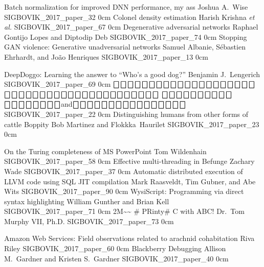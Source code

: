 \addpaper
	{Batch normalization for improved DNN performance, my ass}
	{Joshua A.\ Wise}
	{}
	{SIGBOVIK_2017_paper_32}
	{0cm}
	{}
\addpaper
	{Colonel density estimation}
	{Harish Krishna \textit{et al.}}
	{}
	{SIGBOVIK_2017_paper_67}
	{0cm}
	{}
\addpaper
	{Degenerative adversarial networks}
	{Raphael Gontijo Lopes and Diptodip Deb}
	{}
	{SIGBOVIK_2017_paper_74}
	{0cm}
	{}
\addpaper
	{Stopping GAN violence: Generative unadversarial networks}
	{Samuel Albanie, S\'ebastien Ehrhardt, and Jo\~ao Henriques}
	{}
	{SIGBOVIK_2017_paper_13}
	{0cm}
	{}


\addpaper
	{DeepDoggo: Learning the answer to ``Who's a good dog?''}
	{Benjamin J.\ Lengerich}
	{}
	{SIGBOVIK_2017_paper_69}
	{0cm}
	{}
\addpaper
	{$\bigbox\bigbox\bigbox\bigbox\bigbox\bigbox\bigbox\bigbox\bigbox\bigbox\bigbox\bigbox\bigbox\bigbox$\quad $\bigbox\bigbox\bigbox\bigbox\bigbox\bigbox$\quad $\bigbox\bigbox\bigbox\bigbox$\quad $\bigbox\bigbox\bigbox\bigbox\bigbox$\quad $\bigbox\bigbox\bigbox\bigbox\bigbox$\quad $\bigbox\bigbox$\quad $\bigbox\bigbox\bigbox\bigbox\bigbox\bigbox$}
	{$\bigbox\bigbox\bigbox\bigbox\bigbox\bigbox\bigbox$\quad $\bigbox\bigbox\bigbox$\quad $\bigbox\bigbox\bigbox\bigbox\bigbox\bigbox\bigbox\bigbox$\quad and\quad $\bigbox\bigbox\bigbox\bigbox\bigbox\bigbox\bigbox\bigbox$\quad $\bigbox\bigbox\bigbox\bigbox\bigbox\bigbox\bigbox\bigbox$}
	{}
	{SIGBOVIK_2017_paper_22}
	{0cm}
	{}
\addpaper
	{Distinguishing humans from other forms of cattle}
	{Boppity Bob Martinez and Flokkka\textdegree\ Haurilet}
	{}
	{SIGBOVIK_2017_paper_23}
	{0cm}
	{}

\addpaper
	{On the Turing completeness of MS PowerPoint}
	{Tom Wildenhain}
	{}
	{SIGBOVIK_2017_paper_58}
	{0cm}
	{}
\addpaper
	{Effective multi-threading in Befunge}
	{Zachary Wade}
	{}
	{SIGBOVIK_2017_paper_37}
	{0cm}
	{}
\addpaper
	{Automatic distributed execution of LLVM code using SQL JIT compilation}
	{Mark Raasveldt, Tim Gubner, and Abe Wits}
	{}
	{SIGBOVIK_2017_paper_90}
	{0cm}
	{}
\addpaper
	{WysiScript: Programming via direct syntax highlighting}
	{William Gunther and Brian Kell}
	{}
	{SIGBOVIK_2017_paper_71}
	{0cm}
	{}
\addpaper
	{2M\~{}\~{} \# PRinty\# C with ABC!}
	{Dr.\ Tom Murphy VII, Ph.D.}
	{}
	{SIGBOVIK_2017_paper_73}
	{0cm}
	{}

\addpaper
	{Amazon Web Services: Field observations related to arachnid cohabitation}
	{Riva Riley}
	{}
	{SIGBOVIK_2017_paper_60}
	{0cm}
	{}
\addpaper
	{Blackberry Debugging}
	{Allison M.\ Gardner and Kristen S.\ Gardner}
	{}
	{SIGBOVIK_2017_paper_40}
	{0cm}
	{}

